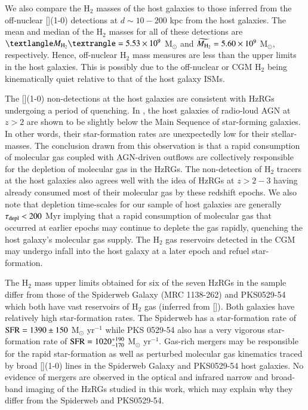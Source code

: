 We also compare the H$_2$ masses of the host galaxies to those inferred from the off-nuclear [](1-0) detections at $d\sim10-200$ kpc from the host galaxies. The mean and median of the H$_2$ masses for all of these detections are $\textlangle M_{\rm H_2} \textrangle = 5.53\e{9}$ M$_\odot$ and $\widetilde{M_{\rm H_2}} = 5.60\times 10^{9}$ M$_\odot,$ respectively. Hence, off-nuclear H$_2$ mass measures are less than the upper limits in the host galaxies. This is possibly due to the off-nuclear or CGM H$_2$ being kinematically quiet relative to that of the host galaxy ISMs. 

The [](1-0) non-detections at the host galaxies are consistent with HzRGs undergoing a period of quenching. In \citet{falkendal2019}, the host galaxies of radio-loud AGN at $z > 2$ are shown to be slightly below the Main Sequence of star-forming galaxies. In other words, their star-formation rates are unexpectedly low for their stellar-masses. The conclusion drawn from this observation is that a rapid consumption of molecular gas coupled with AGN-driven outflows are collectively responsible for the depletion of molecular gas in the HzRGs. The non-detection of H$_2$ tracers at the host galaxies also agrees well with the idea of HzRGs at $z > 2 - 3$ having already consumed most of their molecular gas by these redshift epochs. We also note that depletion time-scales for our sample of host galaxies are generally $\tau_{\rm depl} < 200$ Myr implying that a rapid consumption of molecular gas that occurred at earlier epochs may continue to deplete the gas rapidly, quenching the host galaxy's molecular gas supply. The H$_2$ gas reservoirs detected in the CGM may undergo infall into the host galaxy at a later epoch and refuel star-formation. 

The H$_2$ mass upper limits obtained for six of the seven HzRGs in the sample differ from those of the Spiderweb Galaxy (MRC 1138-262) \citep{emonts2018} and PKS0529-54 \citep{Man2019} which both have vast reservoirs of H$_2$ gas (inferred from []). Both galaxies have relatively high star-formation rates. The Spiderweb has a star-formation rate of $\rm SFR =1390 \pm 150$ M$_\odot$ yr$^{-1}$ while PKS 0529-54 also has a very vigorous star-formation rate of $\rm SFR = 1020^{+190}_{-170}$ M$_\odot$ yr$^{-1}.$ Gas-rich mergers may be responsible for the rapid star-formation as well as perturbed molecular gas kinematics traced by broad [](1-0) lines in the Spiderweb Galaxy and PKS0529-54 host galaxies. No evidence of mergers are observed in the optical and infrared narrow and broad-band imaging of the HzRGs studied in this work, which may explain why they differ from the Spiderweb and PKS0529-54. 

